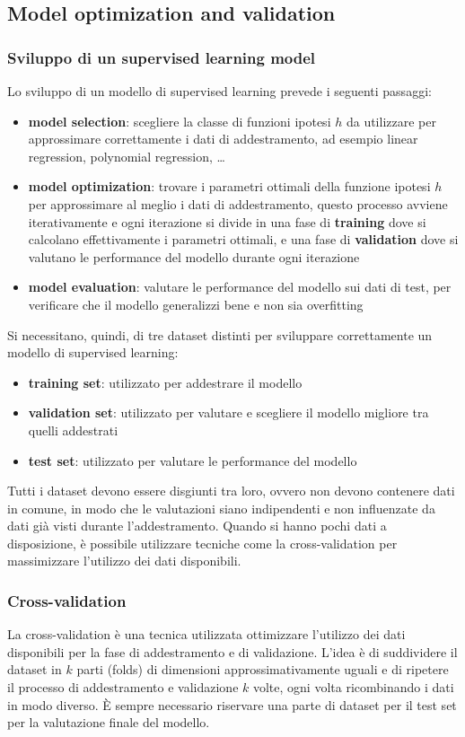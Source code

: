 \subsection{Model optimization and validation}
\subsubsection*{Sviluppo di un supervised learning model}
Lo sviluppo di un modello di supervised learning prevede i seguenti passaggi:
\begin{itemize}
	\item \textbf{model selection}: scegliere la classe di funzioni ipotesi \(h\) da utilizzare per approssimare correttamente
	i dati di addestramento, ad esempio linear regression, polynomial regression, \dots
	\item \textbf{model optimization}: trovare i parametri ottimali della funzione ipotesi \(h\) per approssimare al meglio
	i dati di addestramento, questo processo avviene iterativamente e ogni iterazione si divide in una fase di \textbf{training}
	dove si calcolano effettivamente i parametri ottimali, e una fase di \textbf{validation} dove si valutano le performance
	del modello durante ogni iterazione
	\item \textbf{model evaluation}: valutare le performance del modello sui dati di test, per verificare che il modello
	generalizzi bene e non sia overfitting
\end{itemize}
Si necessitano, quindi, di tre dataset distinti per sviluppare correttamente un modello di supervised learning:
\begin{itemize}
	\item \textbf{training set}: utilizzato per addestrare il modello
	\item \textbf{validation set}: utilizzato per valutare e scegliere il modello migliore tra quelli addestrati
	\item \textbf{test set}: utilizzato per valutare le performance del modello
\end{itemize}
Tutti i dataset devono essere disgiunti tra loro, ovvero non devono contenere dati in comune, in modo che le valutazioni siano
indipendenti e non influenzate da dati già visti durante l'addestramento. Quando si hanno pochi dati a disposizione, è possibile
utilizzare tecniche come la cross-validation per massimizzare l'utilizzo dei dati disponibili.

\subsubsection*{Cross-validation}
La cross-validation è una tecnica utilizzata ottimizzare l'utilizzo dei dati disponibili per la fase di addestramento
e di validazione. L'idea è di suddividere il dataset in \(k\) parti (folds) di dimensioni approssimativamente uguali
e di ripetere il processo di addestramento e validazione \(k\) volte, ogni volta ricombinando i dati in modo diverso.
È sempre necessario riservare una parte di dataset per il test set per la valutazione finale del modello.

